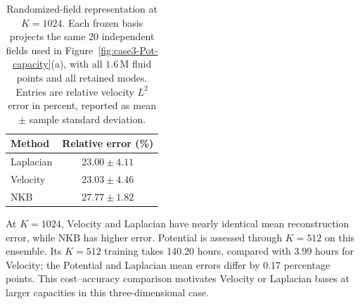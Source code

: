 \begin{table}[!htb]\centering\small
\caption{Randomized-field representation at $K=1024$. Each frozen basis projects the same 20 independent fields used in Figure~\ref{fig:case3-Pot-capacity}(a), with all $1.6\,\mathrm{M}$ fluid points and all retained modes. Entries are relative velocity $L^2$ error in percent, reported as mean $\pm$ sample standard deviation.}
\label{tab:randomfield-K1024}
\begin{tabular}{lc}\toprule
Method&Relative error (\%)\\\midrule
Laplacian&$23.00\pm4.11$\\
Velocity&$23.03\pm4.46$\\
NKB&$27.77\pm1.82$\\
\bottomrule\end{tabular}
\end{table}
At $K=1024$, Velocity and Laplacian have nearly identical mean reconstruction error, while NKB has higher error. Potential is assessed through $K=512$ on this ensemble. Its $K=512$ training takes 140.20 hours, compared with 3.99 hours for Velocity; the Potential and Laplacian mean errors differ by 0.17 percentage points. This cost--accuracy comparison motivates Velocity or Laplacian bases at larger capacities in this three-dimensional case.
